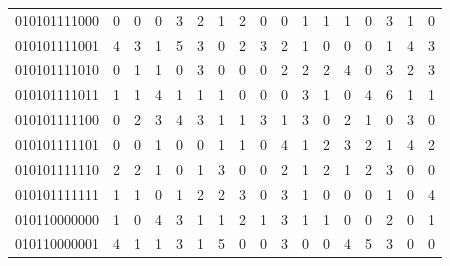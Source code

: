 \documentclass[10pt,a4paper]{article}
\begin{document}
\begin{longtable}{ |c|c|c|c|c|c|c|c|c|c|c|c|c|c|c|c|c| }
    010101111000              & 0                            & 0                                & 0                            & 3                              & 2   & 1   & 2   & 0   & 0   & 1   & 1   & 1   & 0   & 3   & 1   & 0   \\
    010101111001              & 4                            & 3                                & 1                            & 5                              & 3   & 0   & 2   & 3   & 2   & 1   & 0   & 0   & 0   & 1   & 4   & 3   \\
    010101111010              & 0                            & 1                                & 1                            & 0                              & 3   & 0   & 0   & 0   & 2   & 2   & 2   & 4   & 0   & 3   & 2   & 3   \\
    010101111011              & 1                            & 1                                & 4                            & 1                              & 1   & 1   & 0   & 0   & 0   & 3   & 1   & 0   & 4   & 6   & 1   & 1   \\
    010101111100              & 0                            & 2                                & 3                            & 4                              & 3   & 1   & 1   & 3   & 1   & 3   & 0   & 2   & 1   & 0   & 3   & 0   \\
    010101111101              & 0                            & 0                                & 1                            & 0                              & 0   & 1   & 1   & 0   & 4   & 1   & 2   & 3   & 2   & 1   & 4   & 2   \\
    010101111110              & 2                            & 2                                & 1                            & 0                              & 1   & 3   & 0   & 0   & 2   & 1   & 2   & 1   & 2   & 3   & 0   & 0   \\
    010101111111              & 1                            & 1                                & 0                            & 1                              & 2   & 2   & 3   & 0   & 3   & 1   & 0   & 0   & 0   & 1   & 0   & 4   \\
    010110000000              & 1                            & 0                                & 4                            & 3                              & 1   & 1   & 2   & 1   & 3   & 1   & 1   & 0   & 0   & 2   & 0   & 1   \\
    010110000001              & 4                            & 1                                & 1                            & 3                              & 1   & 5   & 0   & 0   & 3   & 0   & 0   & 4   & 5   & 3   & 0   & 0   \\

\end{longtable}
\end{document}
